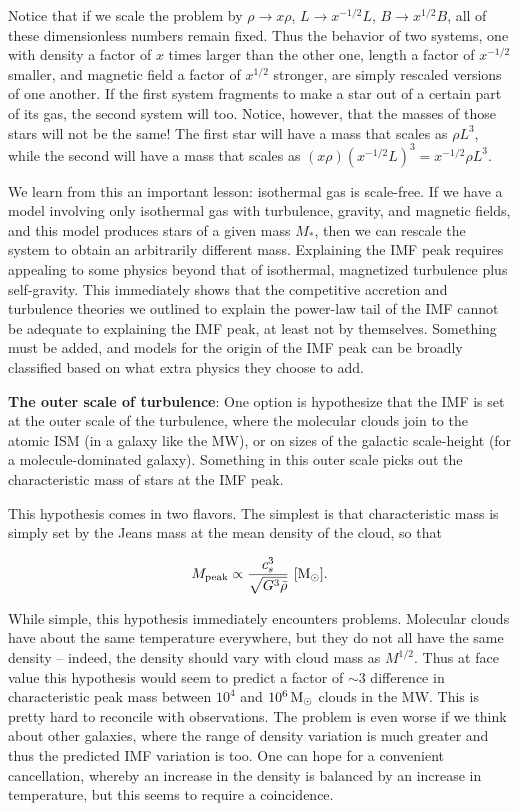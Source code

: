 \documentclass[a4paper,10pt]{article}
\begin{document}
{\noindent}Notice that if we scale the problem by $\rho\rightarrow x\rho$, $L\rightarrow x^{-1/2}L$, $B\rightarrow x^{1/2}B$, all of these dimensionless numbers remain fixed. Thus the behavior of two systems, one with density a factor of $x$ times larger than the other one, length a factor of $x^{-1/2}$ smaller, and magnetic field a factor of $x^{1/2}$ stronger, are simply rescaled versions of one another. If the first system fragments to make a star out of a certain part of its gas, the second system will too. Notice, however, that the masses of those stars will not be the same! The first star will have a mass that scales as $\rho L^3$, while the second will have a mass that scales as $(x\rho)(x^{-1/2}L)^3=x^{-1/2}\rho L^3$.

{\noindent}We learn from this an important lesson: isothermal gas is scale-free. If we have a model involving only isothermal gas with turbulence, gravity, and magnetic fields, and this model produces stars of a given mass $M_*$, then we can rescale the system to obtain an arbitrarily different mass. Explaining the IMF peak requires appealing to some physics beyond that of isothermal, magnetized turbulence plus self-gravity. This immediately shows that the competitive accretion and turbulence theories we outlined to explain the power-law tail of the IMF cannot be adequate to explaining the IMF peak, at least not by themselves. Something must be added, and models for the origin of the IMF peak can be broadly classified based on what extra physics they choose to add.

{\noindent}\textbf{The outer scale of turbulence}: One option is hypothesize that the IMF is set at the outer scale of the turbulence, where the molecular clouds join to the atomic ISM (in a galaxy like the MW), or on sizes of the galactic scale-height (for a molecule-dominated galaxy). Something in this outer scale picks out the characteristic mass of stars at the IMF peak.

{\noindent}This hypothesis comes in two flavors. The simplest is that characteristic mass is simply set by the Jeans mass at the mean density of the cloud, so that

\begin{align*}
    M_\mathrm{peak} \propto \frac{c_s^3}{\sqrt{G^3\bar{\rho}}} ~ [{\rm M_\odot}].
\end{align*}

{\noindent}While simple, this hypothesis immediately encounters problems. Molecular clouds have about the same temperature everywhere, but they do not all have the same density -- indeed, the density should vary with cloud mass as $M^{1/2}$. Thus at face value this hypothesis would seem to predict a factor of $\sim3$ difference in characteristic peak mass between $10^4$ and $10^6\,{\rm M_\odot}$ clouds in the MW. This is pretty hard to reconcile with observations. The problem is even worse if we think about other galaxies, where the range of density variation is much greater and thus the predicted IMF variation is too. One can hope for a convenient cancellation, whereby an increase in the density is balanced by an increase in temperature, but this seems to require a coincidence.
\end{document}
